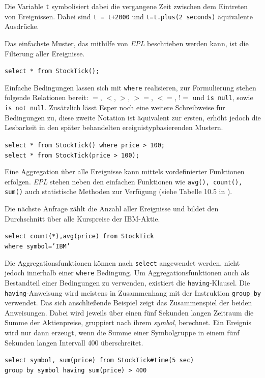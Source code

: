 \documentclass{acm_proc_article-sp}
\begin{document}
Die Variable \texttt{t} symbolisiert dabei die vergangene Zeit zwischen dem Eintreten von 
Ereignissen. Dabei sind \texttt{t = t+2000} und \texttt{t=t.plus(2 seconds)} äquivalente 
Ausdrücke. 

Das einfachste Muster, das mithilfe von \textit{EPL} beschrieben werden kann, ist die 
Filterung aller Ereignisse.

\texttt{select * from StockTick();}

Einfache Bedingungen lassen sich mit \texttt{where} realisieren, zur Formulierung stehen 
folgende Relationen bereit: $=$, $<$, $>$, $>=$, $<=$, $!=$ und  \texttt{is null}, sowie 
\texttt{is not null}. Zusätzlich lässt Esper 
noch eine weitere Schreibweise für Bedingungen zu, diese zweite Notation ist 
äquivalent zur ersten, erhöht jedoch die Lesbarkeit in den später behandelten 
ereignistypbasierenden Mustern.

\texttt{select * from StockTick() where price > 100;}\\
\texttt{select * from StockTick(price > 100);}


Eine Aggregation über alle Ereignisse kann mittels vordefinierter Funktionen erfolgen. 
\textit{EPL} 
stehen neben den einfachen Funktionen wie \texttt{avg(), count(), sum()} auch 
statistische Methoden zur Verfügung (siehe Tabelle 10.5 in \cite{esper-reference}).

Die nächste Anfrage zählt die Anzahl aller Ereignisse und bildet den Durchschnitt über 
alle Kurspreise der IBM-Aktie.

\texttt{select  count(*),avg(price) from StockTick\\where symbol='IBM'}


Die Aggregationsfunktionen können nach \texttt{select} angewendet werden, 
nicht jedoch innerhalb einer \texttt{where} Bedingung. Um Aggregationsfunktionen auch 
als Bestandteil einer Bedingungen zu verwenden, existiert die \texttt{having}-Klausel.
Die \texttt{having}-Anweisung wird meistens in Zusammenhang mit der Instruktion 
\texttt{group\_by} verwendet. Das sich anschließende Beispiel zeigt das Zusammenspiel der 
beiden Anweisungen. Dabei wird jeweils über einen fünf Sekunden langen Zeitraum die Summe 
der Aktienpreise, gruppiert nach ihrem \emph{symbol}, berechnet. Ein Ereignis wird nur 
dann erzeugt, wenn die Summe einer Symbolgruppe in einem fünf Sekunden langen Intervall 
400 überschreitet.

\texttt{select symbol, sum(price) 
from StockTick\#time(5 sec)\\
group by symbol
having sum(price) > 400}
 
\end{document}

